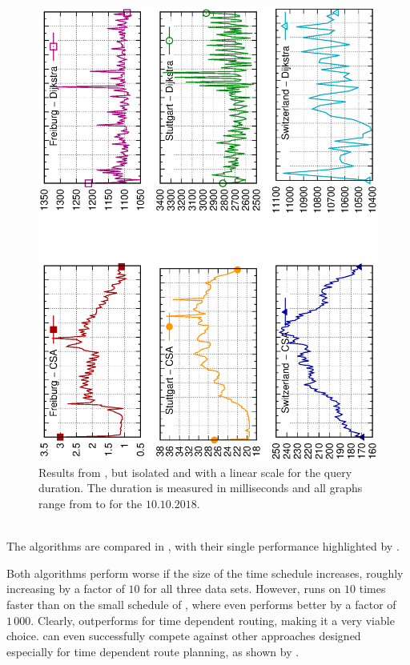 	\begin{figure}[!ht]
		 \begin{center}
			\includegraphics[scale=0.55,angle=-90]{res/plots/uniModalTimeDependentResultsSingle}
		\end{center}
		\caption{Results from , but isolated and with a linear scale for the query duration.
			The duration is measured in milliseconds and all graphs range from  to  for the $10.10.2018$.}
		\label{uniModalTimeDependentResultsSingle}
	\end{figure}\quad\\
	 The algorithms are compared in , with their single performance
	 highlighted by .
	 
	 Both algorithms perform worse if the size of the time schedule increases, roughly increasing by a factor of $10$ for all three data sets.
	 However, \csa runs on \switzerlandR $10$ times faster than \dijkstra on the small schedule of \freiburgR, where \csa even performs better
	 by a factor of $1\,000$. Clearly, \csa outperforms \dijkstra for time dependent routing, making it a very viable choice. \csa can even successfully
	 compete against other approaches designed especially for time dependent route planning, as shown by .
	 
